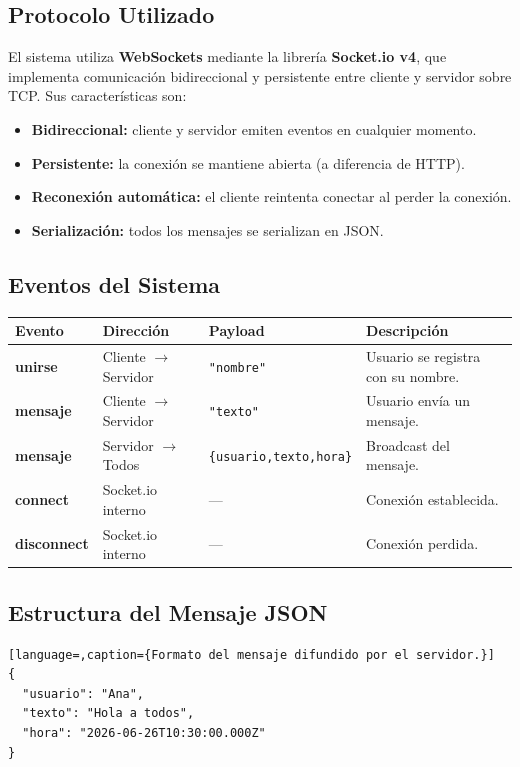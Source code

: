 \documentclass[11pt,a4paper]{article}
\begin{document}
\subsection{Protocolo Utilizado}
El sistema utiliza \textbf{WebSockets} mediante la librería \textbf{Socket.io v4},
que implementa comunicación bidireccional y persistente entre cliente y servidor
sobre TCP. Sus características son:
\begin{itemize}[leftmargin=1.4em]
  \item \textbf{Bidireccional:} cliente y servidor emiten eventos en cualquier momento.
  \item \textbf{Persistente:} la conexión se mantiene abierta (a diferencia de HTTP).
  \item \textbf{Reconexión automática:} el cliente reintenta conectar al perder la conexión.
  \item \textbf{Serialización:} todos los mensajes se serializan en JSON.
\end{itemize}

\subsection{Eventos del Sistema}
\renewcommand{\arraystretch}{1.3}
\begin{tabularx}{\linewidth}{>{\ttfamily\bfseries}l l l X}
\toprule
\normalfont\bfseries Evento & \bfseries Dirección & \bfseries Payload & \bfseries Descripción \\
\midrule
unirse & Cliente $\to$ Servidor & \texttt{"nombre"} & Usuario se registra con su nombre. \\
mensaje & Cliente $\to$ Servidor & \texttt{"texto"} & Usuario envía un mensaje. \\
mensaje & Servidor $\to$ Todos & \texttt{\{usuario,texto,hora\}} & Broadcast del mensaje. \\
connect & Socket.io interno & --- & Conexión establecida. \\
disconnect & Socket.io interno & --- & Conexión perdida. \\
\bottomrule
\end{tabularx}

\subsection{Estructura del Mensaje JSON}
\begin{lstlisting}[language=,caption={Formato del mensaje difundido por el servidor.}]
{
  "usuario": "Ana",
  "texto": "Hola a todos",
  "hora": "2026-06-26T10:30:00.000Z"
}
\end{lstlisting}
\end{document}
